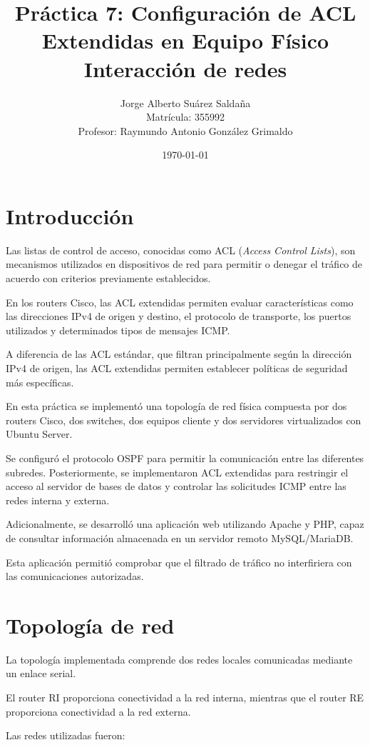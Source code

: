 \documentclass[12pt,a4paper]{article}
\title{
    Práctica 7:
    \textbf{Configuración de ACL Extendidas
    en Equipo Físico}\\[0.5em]
    \large Interacción de redes
}
\author{
    Jorge Alberto Suárez Saldaña\\
    \small Matrícula: 355992\\
    \small Profesor:
    Raymundo Antonio González Grimaldo
}
\date{\today}
\begin{document}
\maketitle

\section{Introducción}

Las listas de control de acceso, conocidas como ACL
(\textit{Access Control Lists}), son mecanismos utilizados
en dispositivos de red para permitir o denegar el
tráfico de acuerdo con criterios previamente establecidos.

En los routers Cisco, las ACL extendidas permiten
evaluar características como las direcciones IPv4
de origen y destino, el protocolo de transporte,
los puertos utilizados y determinados tipos
de mensajes ICMP.

A diferencia de las ACL estándar, que filtran
principalmente según la dirección IPv4 de origen,
las ACL extendidas permiten establecer políticas
de seguridad más específicas.

En esta práctica se implementó una topología de
red física compuesta por dos routers Cisco,
dos switches, dos equipos cliente y dos servidores
virtualizados con Ubuntu Server.

Se configuró el protocolo OSPF para permitir
la comunicación entre las diferentes subredes.
Posteriormente, se implementaron ACL extendidas
para restringir el acceso al servidor de bases
de datos y controlar las solicitudes ICMP entre
las redes interna y externa.

Adicionalmente, se desarrolló una aplicación
web utilizando Apache y PHP, capaz de consultar
información almacenada en un servidor remoto
MySQL/MariaDB.

Esta aplicación permitió comprobar que el
filtrado de tráfico no interfiriera con
las comunicaciones autorizadas.

\section{Topología de red}

La topología implementada comprende dos
redes locales comunicadas mediante un enlace serial.

El router RI proporciona conectividad a
la red interna, mientras que el router RE
proporciona conectividad a la red externa.

Las redes utilizadas fueron:
\end{document}

